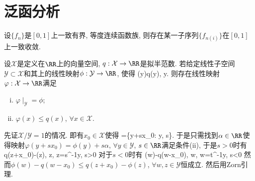 
\newpage
\section{泛函分析}
设$\{f_n\}$是$[0,1]$上一致有界, 等度连续函数族, 则存在某一子序列$\{f_{n(i)}\}$在$[0,1]$上一致收敛.
\et

设$\mathcal X$是定义在$\RR$上的向量空间, $q: \mathcal{X}\to \RR$是拟半范数. 
若给定线性子空间$\mathcal{Y}\subset\mathcal{X}$和其上的线性映射$\phi: \mathcal{Y}\to\RR$, 使得
\bee
\phi(y)\le q(y), \forall y\in{}.
\eee
则存在线性映射$\varphi: \mathcal{X}\to\RR$满足
\begin{enumerate}[(i)]
 \item $\varphi\mid_{\mathcal{Y}}=\phi$;
 \item $\varphi(x)\le q(x)$, $\forall x\in\mathcal{X}$.
\end{enumerate}
\et
\ba
先证$\mathcal{X}/\mathcal{Y}=1$的情况. 即有$x_0\in \mathcal{X}$使得
\bee
{}=\{y+sx_0: y\in{}, s\in{}\}.
\eee
于是只需找到$\alpha\in\RR$使得映射$\varphi(y+sx_0)=\phi(y)+s\alpha$, $\forall y\in\mathcal{Y}$, 
$s\in\RR$满足条件(ii), 于是$s>0$时有
\bee
\alpha\le q(z+x_0)-\phi(z), \forall z\in{}, z=s^{-1}y, s>0
\eee
对于$s<0$时有
\bee
\alpha\ge\phi(w)-q(w-x_0), \forall w\in{}, w=t^{-1}y, s<0
\eee
然而$\phi(w)-q(w-x_0)\le q(z+x_0)-\phi(z)$, $\forall w,z\in\mathcal{Y}$恒成立.
然后用Zorn引理.
\ea

